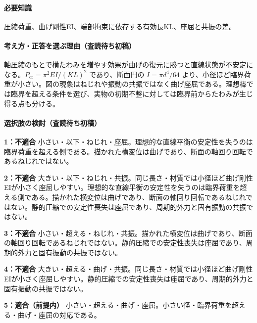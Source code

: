 \paragraph{必要知識} 圧縮荷重、曲げ剛性EI、端部拘束に依存する有効長KL、座屈と共振の差。

\paragraph{考え方・正答を選ぶ理由（査読待ち初稿）} 軸圧縮のもとで横たわみを増やす効果が曲げの復元に勝つと直線状態が不安定になる。\(P_{\mathrm{cr}}=\pi^2EI/(KL)^2\) であり、断面円の \(I=\pi d^4/64\) より、小径ほど臨界荷重が小さい。図の現象はねじれや振動の共振ではなく曲げ座屈である。理想棒では臨界を超える条件を選び、実物の初期不整に対しては臨界前からたわみが生じ得る点も分ける。

\paragraph{選択肢の検討（査読待ち初稿）}\mbox{}\par

\noindent\textbf{1：不適合} 小さい・以下・ねじれ・座屈。理想的な直線平衡の安定性を失うのは臨界荷重を超える側である。描かれた横変位は曲げであり、断面の軸回り回転であるねじれではない。\par

\noindent\textbf{2：不適合} 大きい・以下・ねじれ・共振。同じ長さ・材質では小径ほど曲げ剛性EIが小さく座屈しやすい。理想的な直線平衡の安定性を失うのは臨界荷重を超える側である。描かれた横変位は曲げであり、断面の軸回り回転であるねじれではない。静的圧縮での安定性喪失は座屈であり、周期的外力と固有振動の共振ではない。\par

\noindent\textbf{3：不適合} 小さい・超える・ねじれ・共振。描かれた横変位は曲げであり、断面の軸回り回転であるねじれではない。静的圧縮での安定性喪失は座屈であり、周期的外力と固有振動の共振ではない。\par

\noindent\textbf{4：不適合} 大きい・超える・曲げ・共振。同じ長さ・材質では小径ほど曲げ剛性EIが小さく座屈しやすい。静的圧縮での安定性喪失は座屈であり、周期的外力と固有振動の共振ではない。\par

\noindent\textbf{5：適合（前提内）} 小さい・超える・曲げ・座屈。小さい径・臨界荷重を超える・曲げ・座屈の対応である。\par


